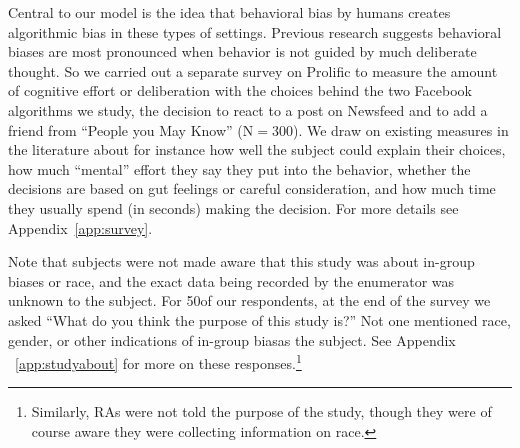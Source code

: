 \documentclass[12pt,letterpaper]{article}
\newcommand{\ProlificSampleSize}{300}
\newcommand{\StudyAboutSampleSize}{50}
\begin{document}
Central to our model is the idea that behavioral bias by humans creates algorithmic bias in these types of settings. Previous research suggests behavioral biases are most pronounced when behavior is not guided by much deliberate thought. So we carried out a separate survey on Prolific to measure the amount of cognitive effort or deliberation with the choices behind the two Facebook algorithms we study, the decision to react to a post on Newsfeed and to add a friend from ``People you May Know'' (N$=$\ProlificSampleSize). We draw on existing measures in the literature about for instance how well the subject could explain their choices, how much ``mental'' effort they say they put into the behavior, whether the decisions are based on gut feelings or careful consideration, and how much time they usually spend (in seconds) making the decision. For more details see Appendix~\ref{app:survey}.

Note that subjects were not made aware that this study was about in-group biases or race, and the exact data being recorded by the enumerator was unknown to the subject. For \StudyAboutSampleSize of our respondents, at the end of the survey we asked ``What do you think the purpose of this study is?'' Not one mentioned race, gender, or other indications of in-group biasas the subject. See Appendix ~\ref{app:studyabout} for more on these responses.\footnote{Similarly, RAs were not told the purpose of the study, though they were of course aware they were collecting information on race.}

    
\end{document}
